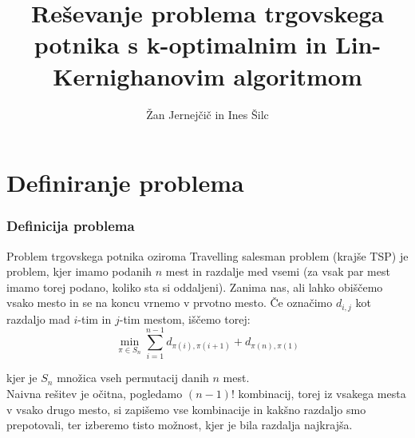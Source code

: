 \documentclass[8pt]{beamer}
\begin{document}
\title[Reševanje TSP s k-opt in LK algoritmom]{Reševanje problema trgovskega potnika s k-optimalnim in
Lin-Kernighanovim algoritmom}
\author[Žan Jernejčič in Ines Šilc]{Žan Jernejčič in Ines Šilc}

\begin{frame}
	\titlepage
\end {frame}

\section[Definiranje problema]{Definiranje problema}
\begin{frame}
\frametitle{Definicija problema}
Problem trgovskega potnika oziroma Travelling salesman problem (krajše TSP) je problem, kjer imamo podanih $n$ mest in razdalje med vsemi (za vsak par mest imamo torej podano, koliko sta si oddaljeni). Zanima nas, ali lahko obiščemo vsako mesto in se na koncu vrnemo v prvotno mesto. Če označimo $d_{i, j}$ kot razdaljo mad $i$-tim in $j$-tim mestom, iščemo torej:\\

$$
\min_{\pi \in S_n} \sum\limits_{i=1}^{n-1} d_{\pi (i), \pi (i+1)} + d_{\pi (n), \pi (1)}
$$

 kjer je $S_n$ množica vseh permutacij danih $n$ mest. \\
\vspace{5mm}
Naivna rešitev je očitna, pogledamo $(n-1)!$ kombinacij, torej iz vsakega mesta v vsako drugo mesto, si zapišemo vse kombinacije in kakšno razdaljo smo prepotovali, ter izberemo tisto možnost, kjer je bila razdalja najkrajša.\\ 
\end{frame}
\end{document}
